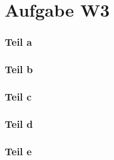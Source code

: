 \documentclass[10pt,a4paper]{article}
\begin{document}
\section{Aufgabe W3}

\subsubsection{Teil a}

\subsubsection{Teil b}

\subsubsection{Teil c}

\subsubsection{Teil d}

\subsubsection{Teil e}
\end{document}
